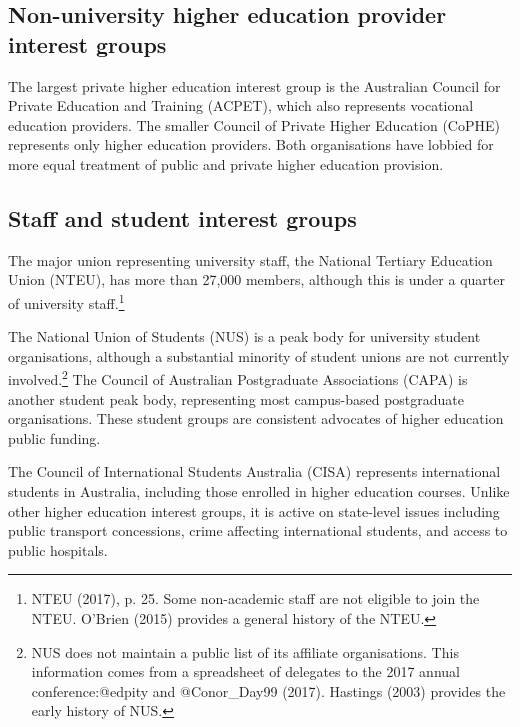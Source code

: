 \documentclass[]{book}
\begin{document}
\hypertarget{non-university-higher-education-provider-interest-groups}{%
\subsection{Non-university higher education provider interest groups}\label{non-university-higher-education-provider-interest-groups}}

The largest private higher education interest group is the Australian Council for Private Education and Training (ACPET), which also represents vocational education providers. The smaller Council of Private Higher Education (CoPHE) represents only higher education providers. Both organisations have lobbied for more equal treatment of public and private higher education provision.

\hypertarget{staff-and-student-interest-groups}{%
\subsection{Staff and student interest groups}\label{staff-and-student-interest-groups}}

The major union representing university staff, the National Tertiary Education Union (NTEU), has more than 27,000 members, although this is under a quarter of university staff.\footnote{NTEU (2017), p. 25. Some non-academic staff are not eligible to join the NTEU. O'Brien (2015) provides a general history of the NTEU.}

The National Union of Students (NUS) is a peak body for university student organisations, although a substantial minority of student unions are not currently involved.\footnote{NUS does not maintain a public list of its affiliate organisations. This information comes from a spreadsheet of delegates to the 2017 annual conference:@edpity and @Conor\_Day99 (2017). Hastings (2003) provides the early history of NUS.} The Council of Australian Postgraduate Associations (CAPA) is another student peak body, representing most campus-based postgraduate organisations. These student groups are consistent advocates of higher education public funding.

The Council of International Students Australia (CISA) represents international students in Australia, including those enrolled in higher education courses. Unlike other higher education interest groups, it is active on state-level issues including public transport concessions, crime affecting international students, and access to public hospitals.
\end{document}

